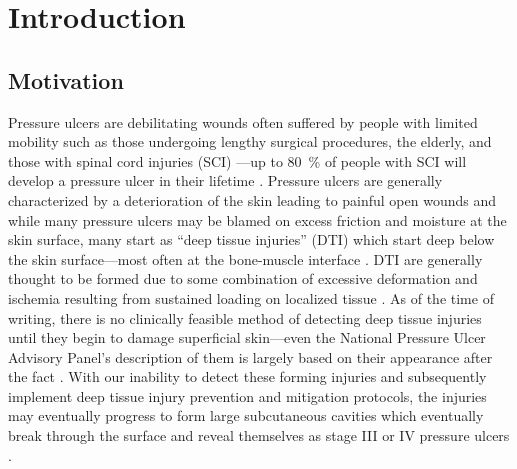 \chapter{Introduction}
	\section{Motivation}
		Pressure ulcers are debilitating wounds often suffered by people with limited mobility such as those undergoing lengthy surgical procedures, the elderly, and those with spinal cord injuries (SCI) \cite{allman95}---up to \SI{80}{\percent} of people with SCI will develop a pressure ulcer in their lifetime \cite{salzberg96}. Pressure ulcers are generally characterized by a deterioration of the skin leading to painful open wounds and while many pressure ulcers may be blamed on excess friction and moisture at the skin surface, many start as ``deep tissue injuries'' (DTI) which start deep below the skin surface---most often at the bone-muscle interface \cite{kanno09}. DTI are generally thought to be formed due to some combination of excessive deformation and ischemia resulting from sustained loading on localized tissue \cite{stekelenburg08, gefen05, loerakker11}. As of the time of writing, there is no clinically feasible method of detecting deep tissue injuries until they begin to damage superficial skin---even the National Pressure Ulcer Advisory Panel's description of them is largely based on their appearance after the fact \cite{npuap07}. With our inability to detect these forming injuries and subsequently implement deep tissue injury prevention and mitigation protocols, the injuries may eventually progress to form large subcutaneous cavities which eventually break through the surface and reveal themselves as stage III or IV pressure ulcers \cite{bouten03,oomens10}.

